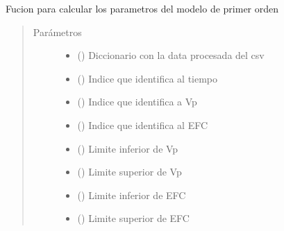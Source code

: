 \documentclass[letterpaper,10pt,spanish]{sphinxmanual}
\begin{document}
\begin{fulllineitems}
\label{\detokenize{codigos/rutinas_CSV:rutinas_CSV.calcular_modelo}}
Fucion para calcular los parametros del modelo de primer orden
\begin{quote}\begin{description}
\item[{Parámetros}] \leavevmode\begin{itemize}
\item {} 
 () \textendash{} Diccionario con la data procesada del csv

\item {} 
 () \textendash{} Indice que identifica al tiempo

\item {} 
 () \textendash{} Indice que identifica a Vp

\item {} 
 () \textendash{} Indice que identifica al EFC

\item {} 
 () \textendash{} Limite inferior de Vp

\item {} 
 () \textendash{} Limite superior de Vp

\item {} 
 () \textendash{} Limite inferior de EFC

\item {} 
 () \textendash{} Limite superior de EFC

\end{itemize}

\end{description}\end{quote}

\end{fulllineitems}
\end{document}
